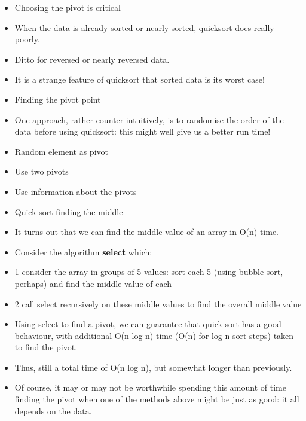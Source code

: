 \documentclass{beamer}
\begin{document}
\begin{frame}
\begin{itemize}
\item Choosing the pivot is critical
\item When the data is already sorted or nearly sorted, quicksort does really poorly.
\item Ditto for reversed or nearly reversed data.
\item It is a strange feature of quicksort that sorted data is its worst case!
\end{itemize}

\end{frame} 

\begin{frame} 
\begin{itemize}
\item Finding the pivot point
\bigskip
\item One approach, rather counter-intuitively, is to randomise the order of the data before using quicksort: this might
well give us a better run time!
\item Random element as pivot
\item Use two pivots
\item Use information about the pivots
\end{itemize}

\end{frame} 

\begin{frame}
\begin{itemize}
\item Quick sort finding the middle
\bigskip
\item It turns out that we can find the middle value of an array in O(n) time.
\item Consider the algorithm \textbf{select} which:
\bigskip
\item 1 consider the array in groups of 5 values: sort each 5 (using bubble sort, perhaps) and find the middle value of
each
\item 2 call select recursively on these middle values to find the overall middle value
\end{itemize}
\end{frame} 

\begin{frame}
\begin{itemize}
\item Using select to find a pivot, we can guarantee that quick sort has a good behaviour, with additional O(n log n)
time (O(n) for log n sort steps) taken to find the pivot.
\item Thus, still a total time of O(n log n), but somewhat longer than previously.
\item Of course, it may or may not be worthwhile spending this amount of time finding the pivot when one of the methods
above might be just as good: it all depends on the data.
\end{itemize}

\end{frame} 
\end{document}
